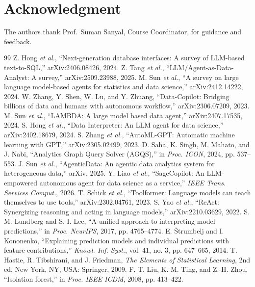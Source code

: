 \documentclass[conference]{IEEEtran}
\begin{document}
\section*{Acknowledgment}
The authors thank Prof.\ Suman Sanyal, Course Coordinator, for guidance and feedback.

\footnotesize
\begin{thebibliography}{99}
\setlength{\itemsep}{-0.6pt}
 Z. Hong \emph{et al.}, ``Next-generation database interfaces: A survey of LLM-based text-to-SQL,'' arXiv:2406.08426, 2024.
 Z. Tang \emph{et al.}, ``LLM/Agent-as-Data-Analyst: A survey,'' arXiv:2509.23988, 2025.
 M. Sun \emph{et al.}, ``A survey on large language model-based agents for statistics and data science,'' arXiv:2412.14222, 2024.
 W. Zhang, Y. Shen, W. Lu, and Y. Zhuang, ``Data-Copilot: Bridging billions of data and humans with autonomous workflow,'' arXiv:2306.07209, 2023.
 M. Sun \emph{et al.}, ``LAMBDA: A large model based data agent,'' arXiv:2407.17535, 2024.
 S. Hong \emph{et al.}, ``Data Interpreter: An LLM agent for data science,'' arXiv:2402.18679, 2024.
 S. Zhang \emph{et al.}, ``AutoML-GPT: Automatic machine learning with GPT,'' arXiv:2305.02499, 2023.
 D. Saha, K. Singh, M. Mahato, and J. Nabi, ``Analytics Graph Query Solver (AGQS),'' in \emph{Proc. ICON}, 2024, pp. 537--553.
 J. Sun \emph{et al.}, ``AgenticData: An agentic data analytics system for heterogeneous data,'' arXiv, 2025.
 Y. Liao \emph{et al.}, ``SageCopilot: An LLM-empowered autonomous agent for data science as a service,'' \emph{IEEE Trans. Services Comput.}, 2026.
 T. Schick \emph{et al.}, ``Toolformer: Language models can teach themselves to use tools,'' arXiv:2302.04761, 2023.
 S. Yao \emph{et al.}, ``ReAct: Synergizing reasoning and acting in language models,'' arXiv:2210.03629, 2022.
 S. M. Lundberg and S.-I. Lee, ``A unified approach to interpreting model predictions,'' in \emph{Proc. NeurIPS}, 2017, pp. 4765--4774.
 E. \v{S}trumbelj and I. Kononenko, ``Explaining prediction models and individual predictions with feature contributions,'' \emph{Knowl. Inf. Syst.}, vol. 41, no. 3, pp. 647--665, 2014.
 T. Hastie, R. Tibshirani, and J. Friedman, \emph{The Elements of Statistical Learning}, 2nd ed. New York, NY, USA: Springer, 2009.
 F. T. Liu, K. M. Ting, and Z.-H. Zhou, ``Isolation forest,'' in \emph{Proc. IEEE ICDM}, 2008, pp. 413--422.

\end{thebibliography}
\end{document}
